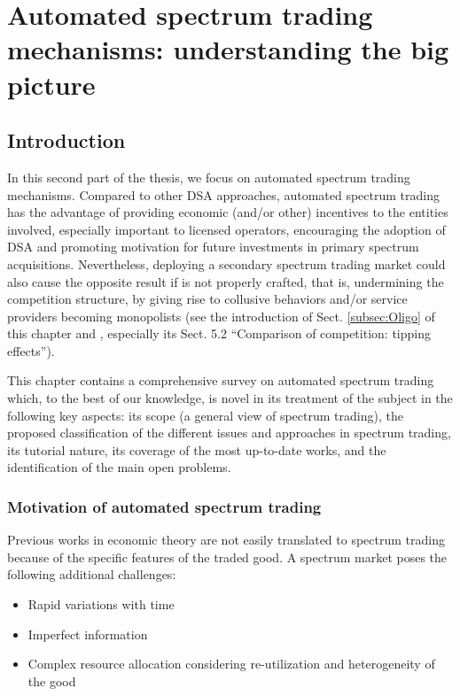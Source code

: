 \graphicspath{ {img/Survey/} }
\chapter[Automated spectrum trading mechanisms: understanding the big picture][Automated spectrum trading mechanisms]{Automated spectrum trading mechanisms: understanding the big picture}\label{Survey_chap}
\section{Introduction}\label{Survey_sec_Intro}
In this second part of the thesis, we focus on automated spectrum trading mechanisms.
Compared to other DSA approaches, automated spectrum trading has the advantage of providing economic (and/or other) incentives to the entities involved, especially important to licensed operators, encouraging the adoption of DSA and promoting motivation for future investments in primary spectrum acquisitions.
Nevertheless, deploying a secondary spectrum trading market could also cause the opposite result if is not properly crafted, that is, undermining the competition structure, by giving rise to collusive behaviors and/or service providers becoming monopolists (see the introduction of Sect. \ref{subsec:Oligo} of this chapter and \cite{ref:Yoon2012}, especially its Sect. 5.2 \enquote{Comparison of competition: tipping effects}).

This chapter contains a comprehensive survey on automated spectrum trading which, to the best of our knowledge, is novel in its treatment of the subject in the following key aspects: its scope (a general view of spectrum trading), the proposed classification of the different issues and approaches in spectrum trading, its tutorial nature, its coverage of the most up-to-date works, and the identification of the main open problems.  

\subsection{Motivation of automated spectrum trading}
Previous works in economic theory are not easily translated to spectrum trading because of the specific features of the traded good. A spectrum market poses the following additional challenges:
\begin{itemize}
\tightlist
\item{Rapid variations with time}
\item{Imperfect information}
\item{Complex resource allocation considering re-utilization and heterogeneity of the good}
\end{itemize}

